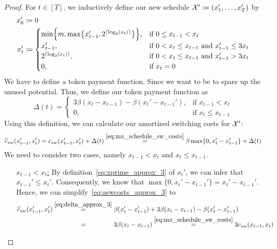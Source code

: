 \begin{proof}
For $t\in[T]$, we inductively define our new schedule $\mathcal{X}'\coloneqq(x_1',\ldots,x_T')$ by
\begin{align}
		x'_0&\coloneqq 0\nonumber\\
		x'_t&\coloneqq 
		\begin{cases}
			\min\Bigl\{m,\max\bigl\{x_{t-1}',2^{\lceil \log_2(x_t)\rceil}\bigr\}\Bigr\}, & \text{if }0\le x_{t-1}<x_t\\
			x'_{t-1}, & \text{if $0<x_t\le x_{t-1}$ and }x'_{t-1}\le 3x_t\\
			2^{\lceil \log_2(x_t)\rceil}, & \text{if $0<x_t\le x_{t-1}$ and }x'_{t-1}>3x_t\\
			0, & \text{if }x_t=0
		\end{cases} \label{eq:xprime_approx_3}
\end{align}
We have to define a token payment function. Since we want to be to spare up the unused potential. Thus, we define our token payment function as
\begin{equation}
	\Delta(t)=\begin{cases}
		3\beta(x_t-x_{t-1})-\beta(x_t'-x_{t-1}'), & \text{if }x_{t-1}<x_t\\
		0, & \text{if }x_t\le x_{t-1}\label{eq:delta_approx_3}
	\end{cases}
\end{equation}
Using this definition, we can calculate our amortized switching costs for $\mathcal{X}'$: 
\begin{equation}
	\widehat{c}_{sw}(x_{t-1}',x_t')=c_{sw}(x_{t-1}',x_t')+\Delta(t)\stackrel{\eqref{eq:mx_schedule_sw_costs}}{=}\beta\max\{0,x_t'-x_{t-1}'\}+\Delta(t)\label{eq:aswcosts_approx_3}
\end{equation}
We need to consider two cases, namely $x_{t-1}<x_t$ and $x_t\le x_{t-1}$.
\begin{enumerate}[align=left]
	\item[\underline{$x_{t-1}<x_t$:}] By definition~\eqref{eq:xprime_approx_3} of $x_t'$, we can infer that $x_{t-1}'\le x_t'$. Consequently, we know that $\max\{0,x_t'-x_{t-1}'\}=x_t'-x_{t-1}'$. Hence, we can simplify~\eqref{eq:aswcosts_approx_3} to
		\begin{align*}
			\aswcosts(x_{t-1}',x_t')&\stackrel{\eqref{eq:delta_approx_3}}{=}\beta(x_t'-x_{t-1}')+3\beta(x_t-x_{t-1})-\beta(x_t'-x_{t-1}')\\
			&\stackrel{\phantom{\eqref{eq:delta_approx_3}}}{=}3\beta(x_t-x_{t-1})\stackrel{\eqref{eq:mx_schedule_sw_costs}}{=}3\swcosts(x_{t-1},x_t)
		\end{align*}

\end{enumerate}
\end{proof}
